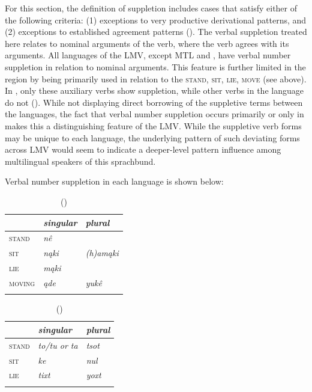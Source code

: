 \documentclass[output=paper]{LSP/langsci}
\begin{document}
	For this section, the definition of suppletion includes cases that satisfy either of the following criteria: (1) exceptions to very productive derivational patterns, and (2) exceptions to established agreement patterns (\citealt[3]{Veselinova2003}). The verbal suppletion treated here relates to nominal arguments of the verb, where the verb agrees with its arguments. All languages of the LMV, except MTL and , have verbal number suppletion in relation to nominal arguments. This feature is further limited in the region by being primarily used in relation to the  \textsc{stand}, \textsc{sit}, \textsc{lie}, \textsc{move} (see above). In , only these auxiliary verbs show suppletion, while other verbs in the language do not (\citealt[40]{Haas1946}). While not displaying direct borrowing of the suppletive terms between the languages, the fact that verbal number suppletion occurs primarily or only in  makes this a distinguishing feature of the LMV. While the suppletive verb forms may be unique to each language, the underlying pattern of such deviating forms across LMV  would seem to indicate a deeper-level pattern influence among multilingual speakers of this sprachbund.

	Verbal number suppletion in each language is shown below:

\begin{table}
\caption{ (\citealt[3]{DorseySwanton1912})}
\begin{tabularx}{.5\textwidth}{X>{\itshape}X>{\itshape}X}
\lsptoprule
& \upshape singular & \upshape plural \\
\midrule
\textsc{stand} & nê & \\
\textsc{sit} & nąki & (h)amąki \\
 \textsc{lie} & mąki & \\ 
 \textsc{moving} & ąde & yukê \\
 \lspbottomrule
\end{tabularx}
\end{table}
\footnotetext{}

\begin{table}
\caption{ (\citealt[3]{GatschetSwanton1932})}
\begin{tabularx}{.5\textwidth}{X>{\itshape}X>{\itshape}X }
\lsptoprule
&\upshape singular & \upshape plural \\
\midrule
\textsc{stand} & to/tu \emph{or} ta & tsot \\
\textsc{sit} & ke & nul \\
\textsc{lie} & tixt & yoxt \\
\lspbottomrule
\end{tabularx} 
\end{table}
\end{document}
